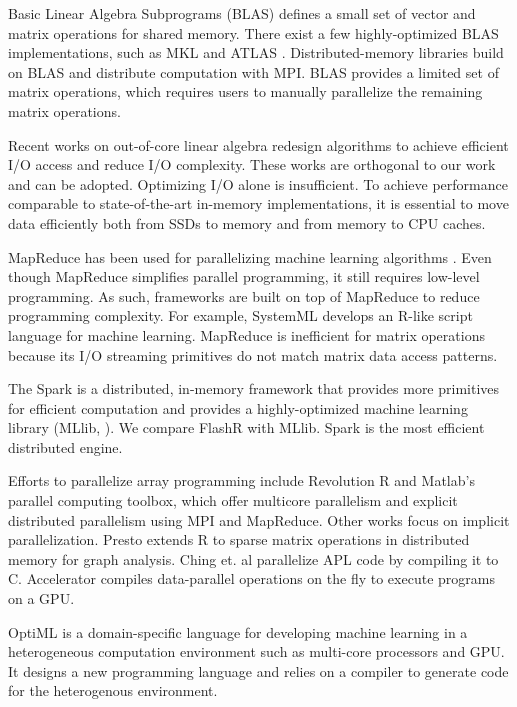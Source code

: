 Basic Linear Algebra Subprograms (BLAS) defines a small set of vector and
matrix operations for shared memory. There exist a few highly-optimized BLAS
implementations, such as MKL \cite{mkl} and ATLAS \cite{atlas}. 
Distributed-memory libraries \cite{trilinos, petsc, elemental}
build on BLAS and distribute computation with MPI.
BLAS provides a limited set of matrix operations, which requires
users to manually parallelize the remaining matrix operations.

Recent works on out-of-core linear algebra \cite{Toledo99, Quintana-Orti12}
redesign algorithms to achieve efficient I/O access and reduce I/O
complexity. These works are orthogonal to our work and can be adopted.
Optimizing I/O
alone is insufficient. To achieve performance comparable to state-of-the-art
in-memory implementations, it is essential to move data efficiently both from
SSDs to memory and from memory to CPU caches.

MapReduce \cite{mapreduce} has been used for parallelizing machine learning
algorithms \cite{Chu06}. Even though MapReduce simplifies parallel programming,
it still requires low-level programming.
As such, frameworks are built on top of MapReduce to reduce programming complexity.
For example, SystemML \cite{systemml} develops an R-like script language for
machine learning. MapReduce is inefficient for matrix operations because
its I/O streaming primitives do not match matrix data access patterns.

The Spark \cite{spark} is a distributed, in-memory framework that provides more
primitives for efficient computation and provides a highly-optimized machine
learning library (MLlib, \cite{mllib}).
We compare FlashR with MLlib. Spark is the most efficient distributed engine.

Efforts to parallelize array programming include
Revolution R \cite{rro} and Matlab's parallel computing toolbox, which
offer multicore parallelism and explicit distributed parallelism using MPI and MapReduce. 
Other works focus on implicit parallelization.
Presto \cite{presto} extends R to sparse matrix operations in distributed memory for graph
analysis. Ching et. al \cite{Ching12} parallelize APL code by
compiling it to C. Accelerator \cite{accelerator} compiles
data-parallel operations on the fly to execute programs on a GPU.

OptiML \cite{optiml} is a domain-specific language for developing machine
learning in a heterogeneous computation environment such as multi-core
processors and GPU. It designs a new programming language and relies on
a compiler to generate code for the heterogenous environment.

